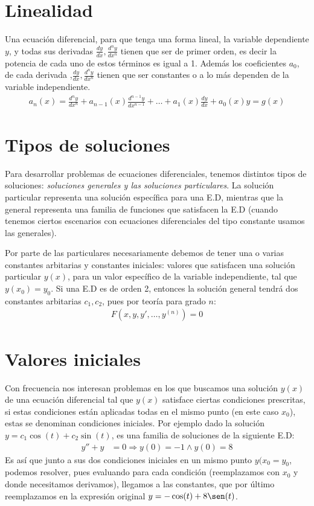 \section{Linealidad}
Una ecuación diferencial, para que tenga una forma lineal, la variable dependiente $y$, y todas sus derivadas $\frac{dy}{dx}, \frac{d^{n}y}{dx^{n}}$ tienen que ser de primer orden, es decir la potencia de cada uno de estos términos es igual a 1. Además los coeficientes $a_{0}$, de cada derivada ,$\frac{dy}{dx}, \frac{d^{n}y}{dx^{n}}$ tienen que ser constantes o a lo más dependen de la variable independiente.
\begin{align*}
  a_{n}(x) = \frac{d^{n}y}{dx^{n}} +  a_{n-1}(x)\frac{d^{n-1}y}{dx^{n-1}}+ \dots + a_{1}(x)\frac{dy}{dx} + a_{0}(x)y = g(x)
\end{align*}

\section{Tipos de soluciones}
Para desarrollar problemas de ecuaciones diferenciales, tenemos distintos tipos de soluciones: \textit{soluciones generales y las soluciones particulares}. La solución particular representa una solución específica para una E.D, mientras que la general representa una familia de funciones que satisfacen la E.D (cuando tenemos ciertos escenarios con ecuaciones diferenciales del tipo constante usamos las generales).

Por parte de las particulares necesariamente debemos de tener una o varias constantes arbitarias y constantes iniciales: valores que satisfacen una solución particular $y(x)$, para un valor específico de la variable independiente, tal que $y(x_{0}) = y_{0}$. Si una E.D es de orden 2, entonces la solución general tendrá dos constantes arbitarias $c_{1}, c_{2}$, pues por teoría para grado $n$: 
\begin{align*}
  F(x, y, y', \dots, y^{(n)}) = 0
\end{align*}

\section{Valores iniciales}
Con frecuencia nos interesan problemas en los que buscamos una solución $y(x)$ de una ecuación diferencial tal que $y(x)$ satisface ciertas condiciones prescritas, si estas condiciones están aplicadas todas en el mismo punto (en este caso $x_{0}$), estas se denominan condiciones iniciales. Por ejemplo dado la solución $y = c_{1} \cos(t) + c_{2} \sin(t)$, es una familia de soluciones de la siguiente E.D:
\begin{align*}
  y'' + y &= 0 \Longrightarrow y(0) = -1 \wedge y(0) = 8
\end{align*}
Es así que junto a sus dos condiciones iniciales en un mismo punto $y(x_{0} = y_{0}$, podemos resolver, pues evaluando para cada condición (reemplazamos con $x_{0}$ y donde necesitamos derivamos), llegamos a las constantes, que por último reemplazamos en la expresión original $y = -\cos(t) + 8\sen(t)$. 
